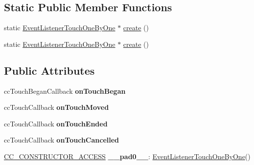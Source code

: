 \subsection*{Static Public Member Functions}
\begin{DoxyCompactItemize}
\item 
static \hyperlink{classEventListenerTouchOneByOne}{Event\+Listener\+Touch\+One\+By\+One} $\ast$ \hyperlink{classEventListenerTouchOneByOne_ab0e266f8a5f242d4ea6e8cf0c170e669}{create} ()
\item 
static \hyperlink{classEventListenerTouchOneByOne}{Event\+Listener\+Touch\+One\+By\+One} $\ast$ \hyperlink{classEventListenerTouchOneByOne_a33833323c7fc8855ad8b98680c3ebc2c}{create} ()
\end{DoxyCompactItemize}
\subsection*{Public Attributes}
\begin{DoxyCompactItemize}
\item 
\mbox{\label{classEventListenerTouchOneByOne_ac6afb065226f8118eec8310a5aad9fc2}} 
cc\+Touch\+Began\+Callback {\bfseries on\+Touch\+Began}
\item 
\mbox{\label{classEventListenerTouchOneByOne_a4220cb9f02b503ad3bceb4f3cbd781d8}} 
cc\+Touch\+Callback {\bfseries on\+Touch\+Moved}
\item 
\mbox{\label{classEventListenerTouchOneByOne_a32249483b8ff16cac4946571617c929d}} 
cc\+Touch\+Callback {\bfseries on\+Touch\+Ended}
\item 
\mbox{\label{classEventListenerTouchOneByOne_af291d099e10060afd34cf84a1a3d04de}} 
cc\+Touch\+Callback {\bfseries on\+Touch\+Cancelled}
\item 
\mbox{\label{classEventListenerTouchOneByOne_a904797fd019e67ad402add223aa155bf}} 
\hyperlink{_2cocos2d_2cocos_2base_2ccConfig_8h_a25ef1314f97c35a2ed3d029b0ead6da0}{C\+C\+\_\+\+C\+O\+N\+S\+T\+R\+U\+C\+T\+O\+R\+\_\+\+A\+C\+C\+E\+SS} {\bfseries \+\_\+\+\_\+pad0\+\_\+\+\_\+}\+: \hyperlink{classEventListenerTouchOneByOne}{Event\+Listener\+Touch\+One\+By\+One}()
\end{DoxyCompactItemize}
